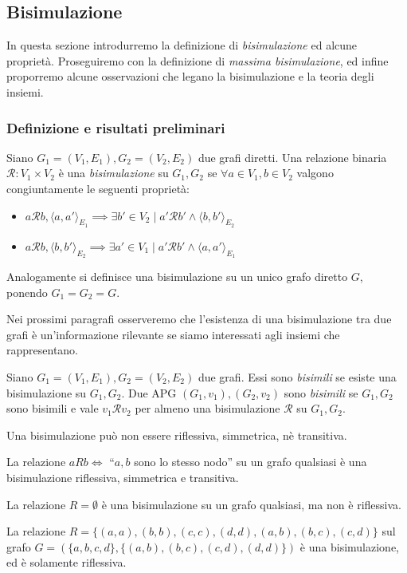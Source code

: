 \subsection{Bisimulazione}
In questa sezione introdurremo la definizione di \emph{bisimulazione} ed alcune proprietà. Proseguiremo con la definizione di \emph{massima bisimulazione}, ed infine proporremo alcune osservazioni che legano la bisimulazione e la teoria degli insiemi.

\subsubsection{Definizione e risultati preliminari}
\begin{definition}
    Siano $G_1 = (V_1,E_1), G_2 = (V_2,E_2)$ due grafi diretti. Una relazione binaria $\mathcal{R}: V_1 \times V_2$ è una \emph{bisimulazione} su $G_1, G_2$ se $\forall a \in V_1, b \in V_2$ valgono congiuntamente le seguenti proprietà:
    \begin{itemize}
        \item $a \mathcal{R} b, \langle a, a' \rangle_{E_1} \implies \exists b' \in V_2 \mid a' \mathcal{R} b' \land \langle b, b' \rangle_{E_2}$
        \item $a \mathcal{R} b, \langle b, b' \rangle_{E_2} \implies \exists a' \in V_1 \mid a' \mathcal{R} b' \land \langle a, a' \rangle_{E_1}$
    \end{itemize}
    Analogamente si definisce una bisimulazione su un unico grafo diretto $G$, ponendo $G_1 = G_2 = G$.
\end{definition}

Nei prossimi paragrafi osserveremo che l'esistenza di una bisimulazione tra due grafi è un'informazione rilevante se siamo interessati agli insiemi che rappresentano.
\begin{definition}
    Siano $G_1 = (V_1,E_1), G_2 = (V_2,E_2)$ due grafi. Essi sono \emph{bisimili} se esiste una bisimulazione su $G_1, G_2$.
    Due APG $(G_1, v_1), (G_2, v_2)$ sono \emph{bisimili} se $G_1, G_2$ sono bisimili e vale $v_1 \mathcal{R} v_2$ per almeno una bisimulazione $\mathcal{R}$ su $G_1, G_2$.
\end{definition}

\begin{observation}
    Una bisimulazione può non essere riflessiva, simmetrica, nè transitiva.
\end{observation}

\begin{example}
    La relazione $a R b \iff$ ``$a,b$ sono lo stesso nodo'' su un grafo qualsiasi è una bisimulazione riflessiva, simmetrica e transitiva.

    La relazione $R = \emptyset$ è una bisimulazione su un grafo qualsiasi, ma non è riflessiva.

    La relazione $R = \{(a,a),(b,b),(c,c),(d,d),(a,b),(b,c),(c,d)\}$ sul grafo $G = (\{a,b,c,d\}, \{(a,b),(b,c),(c,d),(d,d)\})$ è una bisimulazione, ed è solamente riflessiva.
\end{example}

